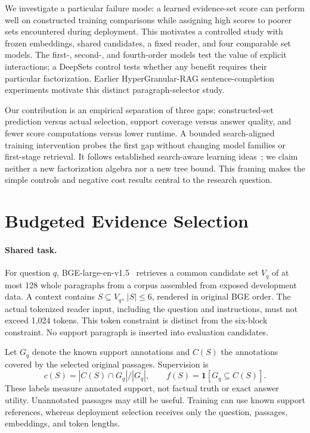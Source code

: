 \documentclass[runningheads]{llncs}
\begin{document}
We investigate a particular failure mode: a learned evidence-set score can
perform well on constructed training comparisons while assigning high
scores to poorer sets encountered during deployment. This motivates a
controlled study with frozen embeddings, shared candidates, a fixed
reader, and four comparable set models. The first-, second-, and
fourth-order models test the value of explicit interactions; a DeepSets
control tests whether any benefit requires their particular factorization.
Earlier HyperGranular-RAG sentence-completion experiments motivate this
distinct paragraph-selector study.

Our contribution is an empirical separation of three gaps: constructed-set
prediction versus actual selection, support coverage versus answer quality,
and fewer score computations versus lower runtime. A bounded search-aligned
training intervention probes the first gap without changing model families
or first-stage retrieval. It follows established search-aware learning
ideas~\cite{wiseman2016bso}; we claim neither a new factorization algebra nor a
new tree bound. This framing makes the simple controls and negative cost
results central to the research question.

\section{Budgeted Evidence Selection}
\paragraph{Shared task.}
For question $q$, BGE-large-en-v1.5~\cite{xiao2023bge} retrieves a common candidate set $V_q$ of at most 128
whole paragraphs from a corpus assembled from exposed development data. A context contains
$S\subseteq V_q$, $|S|\leq6$, rendered in original BGE order. The actual
tokenized reader input, including the question and instructions, must not
exceed 1,024 tokens. This token constraint is distinct from the six-block
constraint. No support paragraph is inserted into evaluation candidates.

Let $G_q$ denote the known support annotations and $C(S)$ the annotations
covered by the selected original passages. Supervision is
\begin{equation}
 c(S)=|C(S)\cap G_q|/|G_q|,\qquad f(S)=\mathbf1[G_q\subseteq C(S)].
\end{equation}
These labels measure annotated support, not factual truth or exact answer
utility. Unannotated passages may still be useful. Training can use known
support references, whereas deployment selection receives only the question,
passages, embeddings, and token lengths.
\end{document}
